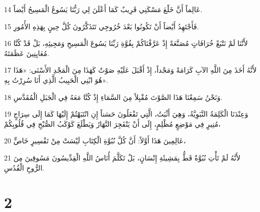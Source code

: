 \par 14 عَالِماً أَنَّ خَلْعَ مَسْكَنِي قَرِيبٌ كَمَا أَعْلَنَ لِي رَبُّنَا يَسُوعُ الْمَسِيحُ أَيْضاً.
\par 15 فَأَجْتَهِدُ أَيْضاً أَنْ تَكُونُوا بَعْدَ خُرُوجِي تَتَذَكَّرُونَ كُلَّ حِينٍ بِهَذِهِ الأُمُورِ.
\par 16 لأَنَّنَا لَمْ نَتْبَعْ خُرَافَاتٍ مُصَنَّعَةً إِذْ عَرَّفْنَاكُمْ بِقُوَّةِ رَبِّنَا يَسُوعَ الْمَسِيحِ وَمَجِيئِهِ، بَلْ قَدْ كُنَّا مُعَايِنِينَ عَظَمَتَهُ.
\par 17 لأَنَّهُ أَخَذَ مِنَ اللَّهِ الآبِ كَرَامَةً وَمَجْداً، إِذْ أَقْبَلَ عَلَيْهِ صَوْتٌ كَهَذَا مِنَ الْمَجْدِ الأَسْنَى: «هَذَا هُوَ ابْنِي الْحَبِيبُ الَّذِي أَنَا سُرِرْتُ بِهِ».
\par 18 وَنَحْنُ سَمِعْنَا هَذَا الصَّوْتَ مُقْبِلاً مِنَ السَّمَاءِ إِذْ كُنَّا مَعَهُ فِي الْجَبَلِ الْمُقَدَّسِ.
\par 19 وَعِنْدَنَا الْكَلِمَةُ النَّبَوِيَّةُ، وَهِيَ أَثْبَتُ، الَّتِي تَفْعَلُونَ حَسَناً إِنِ انْتَبَهْتُمْ إِلَيْهَا كَمَا إِلَى سِرَاجٍ مُنِيرٍ فِي مَوْضِعٍ مُظْلِمٍ، إِلَى أَنْ يَنْفَجِرَ النَّهَارُ وَيَطْلَعَ كَوْكَبُ الصُّبْحِ فِي قُلُوبِكُمْ،
\par 20 عَالِمِينَ هَذَا أَوَّلاً: أَنَّ كُلَّ نُبُوَّةِ الْكِتَابِ لَيْسَتْ مِنْ تَفْسِيرٍ خَاصٍّ،
\par 21 لأَنَّهُ لَمْ تَأْتِ نُبُوَّةٌ قَطُّ بِمَشِيئَةِ إِنْسَانٍ، بَلْ تَكَلَّمَ أُنَاسُ اللَّهِ الْقِدِّيسُونَ مَسُوقِينَ مِنَ الرُّوحِ الْقُدُسِ.

\chapter{2}

